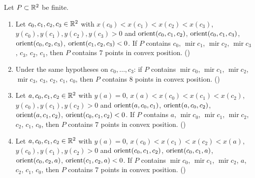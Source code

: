 \begin{lemma}\label{mb:lem:polygons}
Let $P\subset\mathbb R^2$ be finite.
\begin{enumerate}[label=(\alph*)]
\item Let $c_0,c_1,c_2,c_3\in\mathbb R^2$ with $x(c_0)<x(c_1)<x(c_2)<x(c_3)$,
  $y(c_0),y(c_1),y(c_2),y(c_3)>0$ and $\operatorname{orient}(c_0,c_1,c_2)$, $\operatorname{orient}(c_0,c_1,c_3)$, $\operatorname{orient}(c_0,c_2,c_3)$,
  $\operatorname{orient}(c_1,c_2,c_3)<0$. If $P$ contains $c_0$, $\operatorname{mir}c_1$, $\operatorname{mir}c_2$,
  $\operatorname{mir}c_3$, $c_3$, $c_2$, $c_1$, then $P$ contains $7$ points in convex position.
  ()
\item Under the same hypotheses on $c_0,\dots,c_3$: if $P$ contains $\operatorname{mir}c_0$,
  $\operatorname{mir}c_1$, $\operatorname{mir}c_2$, $\operatorname{mir}c_3$, $c_3$, $c_2$, $c_1$, $c_0$, then $P$
  contains $8$ points in convex position. ()
\item Let $a,c_0,c_1,c_2\in\mathbb R^2$ with $y(a)=0$, $x(a)<x(c_0)<x(c_1)<x(c_2)$,
  $y(c_0),y(c_1),y(c_2)>0$ and $\operatorname{orient}(a,c_0,c_1)$, $\operatorname{orient}(a,c_0,c_2)$, $\operatorname{orient}(a,c_1,c_2)$,
  $\operatorname{orient}(c_0,c_1,c_2)<0$. If $P$ contains $a$, $\operatorname{mir}c_0$, $\operatorname{mir}c_1$,
  $\operatorname{mir}c_2$, $c_2$, $c_1$, $c_0$, then $P$ contains $7$ points in convex position.
  ()
\item Let $a,c_0,c_1,c_2\in\mathbb R^2$ with $y(a)=0$, $x(c_0)<x(c_1)<x(c_2)<x(a)$,
  $y(c_0),y(c_1),y(c_2)>0$ and $\operatorname{orient}(c_0,c_1,c_2)$, $\operatorname{orient}(c_0,c_1,a)$, $\operatorname{orient}(c_0,c_2,a)$,
  $\operatorname{orient}(c_1,c_2,a)<0$. If $P$ contains $\operatorname{mir}c_0$, $\operatorname{mir}c_1$, $\operatorname{mir}c_2$, $a$,
  $c_2$, $c_1$, $c_0$, then $P$ contains $7$ points in convex position. ()
\end{enumerate}
\end{lemma}

